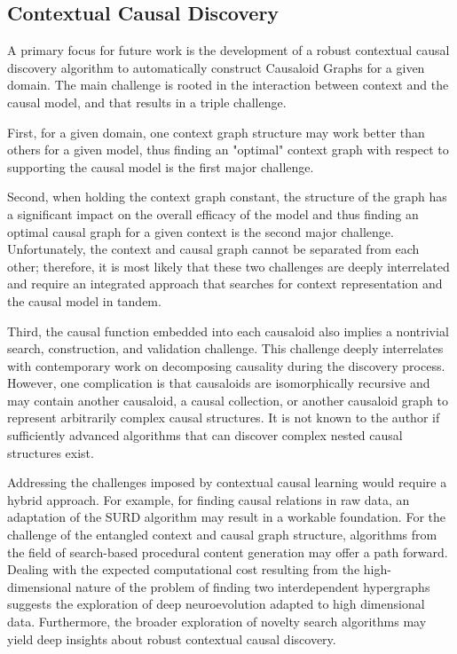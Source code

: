  
\subsection{Contextual Causal Discovery}


A primary focus for future work is the development of a robust contextual causal discovery algorithm to automatically construct Causaloid Graphs for a given domain. The main challenge is rooted in the interaction between context and the causal model, and that results in a triple challenge.

First, for a given domain, one context graph structure may work better than others for a given model, thus finding an "optimal" context graph with respect to supporting the causal model is the first major challenge. 

 Second, when holding the context graph constant, the structure of the graph has a significant impact on the overall efficacy of the model and thus finding an optimal causal graph for a given context is the second major challenge. Unfortunately,  the context and causal graph cannot be separated from each other; therefore, it is most likely that these two challenges are deeply interrelated and require an integrated approach that searches for context representation and the causal model in tandem.  
 
Third, the causal function embedded into each causaloid also implies a nontrivial search, construction, and validation challenge. This challenge deeply interrelates with contemporary work on decomposing causality during the discovery process. However, one complication is that causaloids are isomorphically recursive and may contain another causaloid, a causal collection, or another causaloid graph to represent arbitrarily complex causal structures. It is not known to the author if sufficiently advanced algorithms that can discover complex nested causal structures exist. 


Addressing the challenges imposed by contextual causal learning would require a hybrid approach. For example, for finding causal relations in raw data, an adaptation of the SURD algorithm\cite{martinez2024decomposing} may result in a workable foundation. For the challenge of the entangled context and causal graph structure, algorithms from the field of search-based procedural content generation\cite{togelius2011search} may offer a path forward. Dealing with the expected computational cost resulting from the high-dimensional nature of the problem of finding two interdependent hypergraphs suggests the exploration of deep neuro\-evolution adapted to high dimensional data\cite{colas2020scaling}. Furthermore, the broader exploration of novelty search\cite{lehman2011abandoning} algorithms may yield deep insights about robust contextual causal discovery. 


